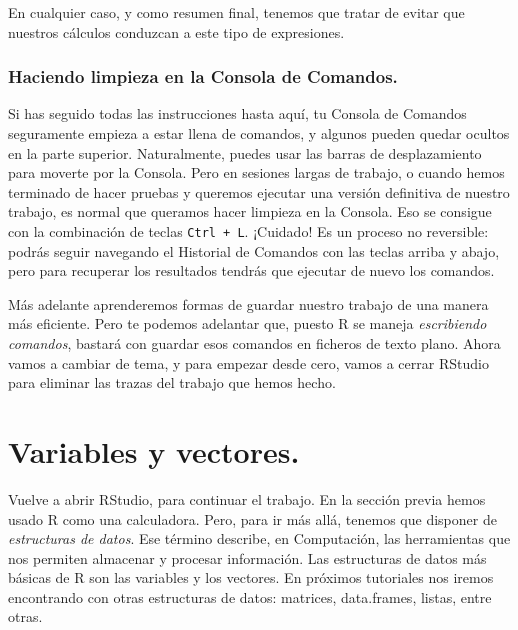 \documentclass[10pt,a4paper]{article}\usepackage[]{graphicx}\usepackage[]{color}
\newcounter {cont01}
\begin{document}
En cualquier caso, y como resumen final,  tenemos que tratar de evitar que nuestros cálculos conduzcan a este tipo de expresiones.




\subsubsection*{Haciendo limpieza en la Consola de Comandos.}

Si has seguido todas las instrucciones hasta aquí, tu Consola de Comandos seguramente empieza a estar llena de comandos, y algunos pueden quedar ocultos en la parte superior. Naturalmente, puedes usar las barras de desplazamiento para moverte por la Consola. Pero en sesiones largas de trabajo, o cuando hemos terminado de hacer pruebas y queremos ejecutar una versión definitiva de nuestro trabajo, es normal que queramos hacer limpieza en la Consola. Eso se consigue con la combinación de teclas {\tt Ctrl + L}. ¡Cuidado! Es un proceso no reversible: podrás seguir navegando el Historial de  Comandos con las teclas arriba y abajo, pero para recuperar los resultados tendrás que ejecutar de nuevo los comandos.

Más adelante aprenderemos formas de guardar nuestro trabajo de una manera más eficiente. Pero te podemos adelantar que, puesto R se maneja {\em escribiendo comandos}, bastará con guardar esos comandos en ficheros de texto plano. Ahora vamos a cambiar de tema, y para empezar desde cero, vamos a cerrar RStudio para eliminar las trazas del trabajo que hemos hecho.



\section{Variables y vectores.}

Vuelve a abrir RStudio, para continuar el trabajo. En la sección previa hemos usado R como una calculadora. Pero, para ir más allá, tenemos que disponer de {\em estructuras de datos}. Ese término describe, en Computación, las herramientas que nos permiten almacenar y procesar información. Las estructuras de datos más básicas de R son las {\sf variables} y los {\sf vectores}. En próximos tutoriales nos iremos encontrando con otras estructuras de datos: {\sf matrices}, {\sf data.frames}, {\sf listas}, entre otras.
\end{document}
